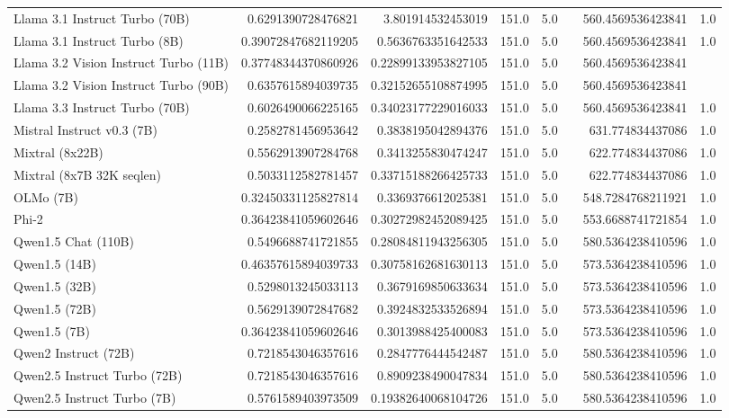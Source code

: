 \begin{table}[htp]
{\begin{tabular}{lrrrrrrr}
Llama 3.1 Instruct Turbo (70B) & 0.6291390728476821 & 3.801914532453019 & 151.0 & 5.0 &  & 560.4569536423841 & 1.0 \\
Llama 3.1 Instruct Turbo (8B) & 0.39072847682119205 & 0.5636763351642533 & 151.0 & 5.0 &  & 560.4569536423841 & 1.0 \\
Llama 3.2 Vision Instruct Turbo (11B) & 0.37748344370860926 & 0.22899133953827105 & 151.0 & 5.0 &  & 560.4569536423841 &  \\
Llama 3.2 Vision Instruct Turbo (90B) & 0.6357615894039735 & 0.32152655108874995 & 151.0 & 5.0 &  & 560.4569536423841 &  \\
Llama 3.3 Instruct Turbo (70B) & 0.6026490066225165 & 0.34023177229016033 & 151.0 & 5.0 &  & 560.4569536423841 & 1.0 \\
Mistral Instruct v0.3 (7B) & 0.2582781456953642 & 0.3838195042894376 & 151.0 & 5.0 &  & 631.774834437086 & 1.0 \\
Mixtral (8x22B) & 0.5562913907284768 & 0.3413255830474247 & 151.0 & 5.0 &  & 622.774834437086 & 1.0 \\
Mixtral (8x7B 32K seqlen) & 0.5033112582781457 & 0.33715188266425733 & 151.0 & 5.0 &  & 622.774834437086 & 1.0 \\
OLMo (7B) & 0.32450331125827814 & 0.3369376612025381 & 151.0 & 5.0 &  & 548.7284768211921 & 1.0 \\
Phi-2 & 0.36423841059602646 & 0.30272982452089425 & 151.0 & 5.0 &  & 553.6688741721854 & 1.0 \\
Qwen1.5 Chat (110B) & 0.5496688741721855 & 0.28084811943256305 & 151.0 & 5.0 &  & 580.5364238410596 & 1.0 \\
Qwen1.5 (14B) & 0.46357615894039733 & 0.30758162681630113 & 151.0 & 5.0 &  & 573.5364238410596 & 1.0 \\
Qwen1.5 (32B) & 0.5298013245033113 & 0.3679169850633634 & 151.0 & 5.0 &  & 573.5364238410596 & 1.0 \\
Qwen1.5 (72B) & 0.5629139072847682 & 0.3924832533526894 & 151.0 & 5.0 &  & 573.5364238410596 & 1.0 \\
Qwen1.5 (7B) & 0.36423841059602646 & 0.3013988425400083 & 151.0 & 5.0 &  & 573.5364238410596 & 1.0 \\
Qwen2 Instruct (72B) & 0.7218543046357616 & 0.2847776444542487 & 151.0 & 5.0 &  & 580.5364238410596 & 1.0 \\
Qwen2.5 Instruct Turbo (72B) & 0.7218543046357616 & 0.8909238490047834 & 151.0 & 5.0 &  & 580.5364238410596 & 1.0 \\
Qwen2.5 Instruct Turbo (7B) & 0.5761589403973509 & 0.19382640068104726 & 151.0 & 5.0 &  & 580.5364238410596 & 1.0 \\

\end{tabular}}
\end{table}
